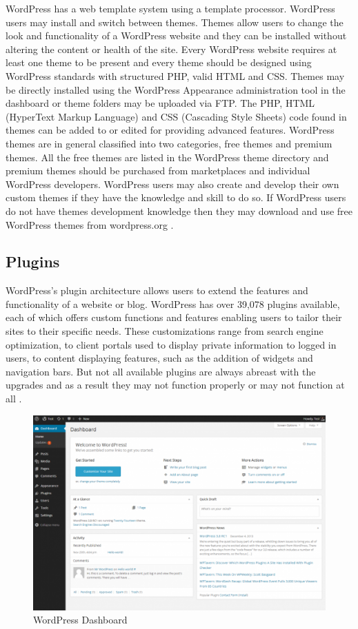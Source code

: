WordPress has a web template system using a template processor.
WordPress users may install and switch between themes. Themes allow users to change the look and functionality of a WordPress website and they can be installed without altering the content or health of the site. Every WordPress website requires at least one theme to be present and every theme should be designed using WordPress standards with structured PHP, valid HTML and CSS. Themes may be directly installed using the WordPress Appearance administration tool in the dashboard or theme folders may be uploaded via FTP. The PHP, HTML (HyperText Markup Language) and CSS (Cascading Style Sheets) code found in themes can be added to or edited for providing advanced features. WordPress themes are in general classified into two categories, free themes and premium themes. All the free themes are listed in the WordPress theme directory and premium themes should be purchased from marketplaces and individual WordPress developers. WordPress users may also create and develop their own custom themes if they have the knowledge and skill to do so. If WordPress users do not have themes development knowledge then they may download and use free WordPress themes from wordpress.org \cite{cms_wp}. 

\subsection{Plugins}
\label{subsec:wp_plugins}


WordPress's plugin architecture allows users to extend the features and functionality of a website or blog. WordPress has over 39,078 plugins available, each of which offers custom functions and features enabling users to tailor their sites to their specific needs. These customizations range from search engine optimization, to client portals used to display private information to logged in users, to content displaying features, such as the addition of widgets and navigation bars. But not all available plugins are always abreast with the upgrades and as a result they may not function properly or may not function at all \cite{cms_wp}.



\begin {figure}[h]
\graphicspath{{images/chapter_cms/}}
\includegraphics[width=\textwidth]{wp_dash}
\caption{WordPress Dashboard}
\end {figure}
